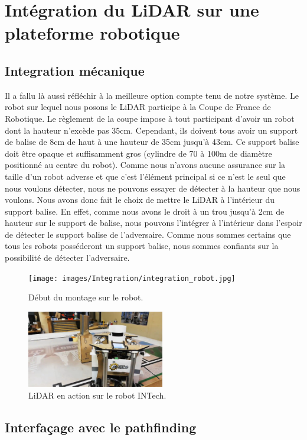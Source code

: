 \section{Intégration du LiDAR sur une plateforme robotique}
\subsection{Integration mécanique}
\tab Il a fallu là aussi réfléchir à la meilleure option compte tenu de notre système. Le robot sur lequel nous posons le LiDAR participe à la Coupe de France de Robotique. Le règlement de la coupe impose à tout participant d'avoir un robot dont la hauteur n'excède pas 35cm. Cependant, ils doivent tous avoir un support de balise de 8cm de haut à une hauteur de 35cm jusqu'à 43cm. Ce support balise doit être opaque et suffisamment gros (cylindre de 70 à 100m de diamètre positionné au centre du robot). Comme nous n'avons aucune assurance sur la taille d'un robot adverse et que c'est l'élément principal si ce n'est le seul que nous voulons détecter, nous ne pouvons essayer de détecter à la hauteur que nous voulons. Nous avons donc fait le choix de mettre le LiDAR à l'intérieur du support balise. En effet, comme nous avons le droit à un trou jusqu'à 2cm de hauteur sur le support de balise, nous pouvons l'intégrer à l'intérieur dans l'espoir de détecter le support balise de l'adversaire. Comme nous sommes certains que tous les robots posséderont un support balise, nous sommes confiants sur la possibilité de détecter l'adversaire.

\begin{figure}[htp]
    \centering
    \texttt{[image: images/Integration/integration\_robot.jpg]}
    \caption{Début du montage sur le robot.}
\end{figure}

\begin{figure}[htp]
    \centering
    \includegraphics[width=6cm]{images/Integration/robot_intech.png}
    \caption{LiDAR en action sur le robot INTech.}
\end{figure}

\subsection{Interfaçage avec le pathfinding}

